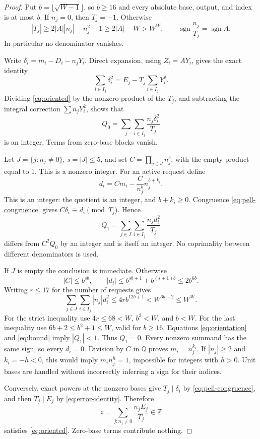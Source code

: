 \documentclass[11pt]{article}
\theoremstyle{definition}\newtheorem{definition}[theorem]{Definition}
\theoremstyle{remark}\newtheorem{remark}[theorem]{Remark}
\newcommand{\Z}{\mathbb Z}
\newcommand{\Q}{\mathbb Q}
\newcommand{\sgn}{\operatorname{sgn}}
\begin{document}
\begin{proof}
Put $b=\lfloor\sqrt{W-1}\rfloor$, so $b\ge16$ and every absolute
base, output, and index is at most $b$. If $n_j=0$, then $T_j=-1$.
Otherwise
\begin{equation}
|T_j|\ge2|A||n_j|-n_j^2-1\ge2|A|-W>W^W,
\qquad \sgn\frac{n_j}{T_j}=\sgn A.
\label{eq:orientation}
\end{equation}
In particular no denominator vanishes.

Write $\delta_i=m_i-D_i-n_jY_i$. Direct expansion, using $Z_i=AY_i$,
gives the exact identity
\begin{equation}
\sum_{i\in I_j}\delta_i^2
=E_j-T_j\sum_{i\in I_j}Y_i^2.
\label{eq:error-identity}
\end{equation}
Dividing \eqref{eq:oriented} by the nonzero product of the $T_j$,
and subtracting the integral correction $\sum n_jY_i^2$, shows that
\[
Q_0=\sum_{j}\sum_{i\in I_j}\frac{n_j\delta_i^2}{T_j}
\]
is an integer. Terms from zero-base blocks vanish.

Let $J=\{j:n_j\ne0\}$, $s=|J|\le5$, and set
$C=\prod_{j\in J}n_j^b$, with the empty product equal to 1.
This is a nonzero integer. For an active request define
\[
d_i=Cm_i-\frac{C}{n_j^b}n_j^{b+k_i}.
\]
This is an integer: the quotient is an integer, and $b+k_i\ge0$.
Congruence \eqref{eq:pell-congruence} gives
$C\delta_i\equiv d_i\pmod {T_j}$. Hence
\[
Q_1=\sum_{j\in J}\sum_{i\in I_j}\frac{n_jd_i^2}{T_j}
\]
differs from $C^2Q_0$ by an integer and is itself an integer. No
coprimality between different denominators is used.

If $J$ is empty the conclusion is immediate. Otherwise
\[
|C|\le b^{sb},\qquad
|d_i|\le b^{sb+1}+b^{(s+1)b}\le2b^{6b}.
\]
Writing $r\le17$ for the number of requests gives
\begin{equation}
\sum_{j\in J}\sum_{i\in I_j}|n_j|d_i^2
\le4r b^{12b+1}<W^{6b+2}\le W^W.
\label{eq:bound}
\end{equation}
For the strict inequality use $4r\le68<W$, $b^2<W$, and $b<W$.
For the last inequality use $6b+2\le b^2+1\le W$, valid for $b\ge16$.
Equations \eqref{eq:orientation} and \eqref{eq:bound} imply
$|Q_1|<1$. Thus $Q_1=0$. Every nonzero summand has the same sign,
so every $d_i=0$. Division by $C$ in $\Q$ proves
$m_i=n_j^{k_i}$. If $|n_j|\ge2$ and $k_i=-h<0$, this would imply
$m_in_j^h=1$, impossible for integers with $h>0$. Unit bases are
handled without incorrectly inferring a sign for their indices.

Conversely, exact powers at the nonzero bases give
$T_j\mid\delta_i$ by \eqref{eq:pell-congruence}, and then
$T_j\mid E_j$ by \eqref{eq:error-identity}. Therefore
\[
z=\sum_{j:n_j\ne0}\frac{n_jE_j}{T_j}\in\Z
\]
satisfies \eqref{eq:oriented}. Zero-base terms contribute nothing.
\end{proof}
\end{document}
